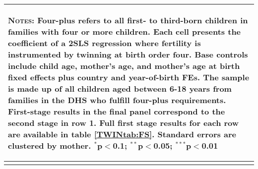 \begin{table}[!htbp]
\begin{tabular}{lcccc}
\hline\multicolumn{5}{p{10.0cm}}{\begin{footnotesize}\textsc{Notes:} Four-plus refers to all first- to third-born children in families with four or more children.  Each cell presents the coefficient of a 2SLS regression where fertility is instrumented by twinning at birth order four.  Base controls include child age, mother's age, and mother's age at birth fixed effects plus country and year-of-birth FEs.  The sample is made up of all children aged between 6-18 years from families in the DHS who fulfill four-plus requirements. First-stage results in the final panel correspond to the second stage in row 1.  Full first stage results for each row are available in table \ref{TWINtab:FS}. Standard errors are clustered by mother. 
$^{*}$p$<$0.1; $^{**}$p$<$0.05; $^{***}$p$<$0.01\end{footnotesize}}
\\\bottomrule\normalsize\end{tabular}\end{table} 

